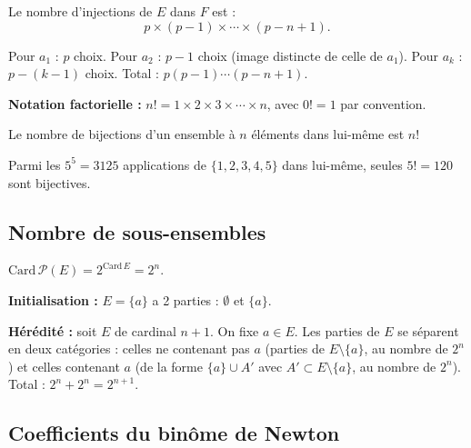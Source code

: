 \begin{propbox}
Le nombre d'injections de $E$ dans $F$ est :
\[p \times (p-1) \times \cdots \times (p - n + 1).\]
\end{propbox}

\begin{proofbox}
Pour $a_1$ : $p$ choix. Pour $a_2$ : $p-1$ choix (image distincte de celle de $a_1$). Pour $a_k$ : $p - (k-1)$ choix. Total : $p(p-1) \cdots (p-n+1)$.
\end{proofbox}

\textbf{Notation factorielle :} $n! = 1 \times 2 \times 3 \times \cdots \times n$, avec $0! = 1$ par convention.

\begin{propbox}
Le nombre de bijections d'un ensemble à $n$ éléments dans lui-même est $n!$
\end{propbox}

\begin{exbox}
Parmi les $5^5 = 3125$ applications de $\{1,2,3,4,5\}$ dans lui-même, seules $5! = 120$ sont bijectives.
\end{exbox}


\subsection{Nombre de sous-ensembles}

\begin{propbox}
$\mathrm{Card}\, \mathcal{P}(E) = 2^{\mathrm{Card}\, E} = 2^n$.
\end{propbox}

\begin{proofbox}
\textbf{Initialisation :} $E = \{a\}$ a 2 parties : $\emptyset$ et $\{a\}$.

\textbf{Hérédité :} soit $E$ de cardinal $n+1$. On fixe $a \in E$. Les parties de $E$ se séparent en deux catégories : celles ne contenant pas $a$ (parties de $E \setminus \{a\}$, au nombre de $2^n$) et celles contenant $a$ (de la forme $\{a\} \cup A'$ avec $A' \subset E \setminus \{a\}$, au nombre de $2^n$). Total : $2^n + 2^n = 2^{n+1}$.
\end{proofbox}


\subsection{Coefficients du binôme de Newton}

